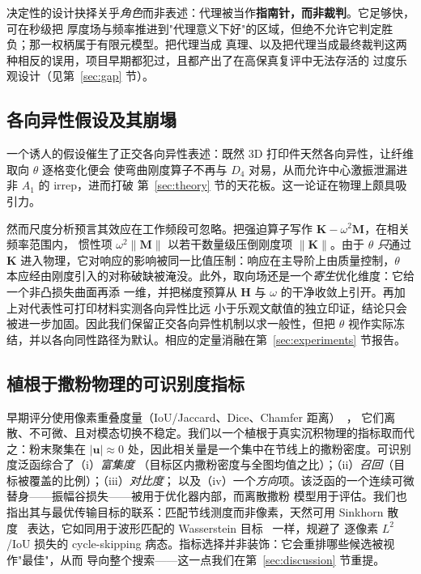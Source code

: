 \documentclass[11pt,a4paper]{article}
\newcommand{\Aone}{A_1}
\newcommand{\Dfour}{D_4}
\newcommand{\matH}{\mathbf{H}}
\newcommand{\matK}{\mathbf{K}}
\newcommand{\matM}{\mathbf{M}}
\begin{document}
决定性的设计抉择关乎\emph{角色}而非表述：代理被当作\textbf{指南针，而非裁判}。它足够快，可在秒级把
厚度场与频率推进到"代理意义下好"的区域，但绝不允许它判定胜负；那一权柄属于有限元模型。把代理当成
真理、以及把代理当成最终裁判这两种相反的误用，项目早期都犯过，且都产出了在高保真复评中无法存活的
过度乐观设计（见第~\ref{sec:gap} 节）。

\subsection{各向异性假设及其崩塌}\label{sec:aniso}
一个诱人的假设催生了正交各向异性表述：既然 3D 打印件天然各向异性，让纤维取向 $\theta$ 逐格变化便会
使弯曲刚度算子不再与 $\Dfour$ 对易，从而允许中心激振泄漏进非 $\Aone$ 的 irrep，进而打破
第~\ref{sec:theory} 节的天花板。这一论证在物理上颇具吸引力。

然而尺度分析预言其效应在工作频段可忽略。把强迫算子写作 $\matK-\omega^2\matM$，在相关频率范围内，
惯性项 $\omega^2\lVert\matM\rVert$ 以若干数量级压倒刚度项 $\lVert\matK\rVert$。由于 $\theta$
\emph{只}通过 $\matK$ 进入物理，它对响应的影响被同一比值压制：响应在主导阶上由质量控制，$\theta$
本应经由刚度引入的对称破缺被淹没。此外，取向场还是一个\emph{寄生}优化维度：它给一个非凸损失曲面再添
一维，并把梯度预算从 $\matH$ 与 $\omega$ 的干净收敛上引开。再加上对代表性可打印材料实测各向异性比远
小于乐观文献值的独立印证，结论只会被进一步加固。因此我们保留正交各向异性机制以求一般性，但把 $\theta$
视作实际冻结，并以各向同性路径为默认。相应的定量消融在第~\ref{sec:experiments} 节报告。

\subsection{植根于撒粉物理的可识别度指标}\label{sec:metric}
早期评分使用像素重叠度量（IoU/Jaccard、Dice、Chamfer 距离）~\cite{jaccard1912,dice1945,barrow1977}，
它们离散、不可微、且对模态切换不稳定。我们以一个植根于真实沉积物理的指标取而代之：粉末聚集在
$|\bm{u}|\approx0$ 处，因此相关量是一个集中在节线上的撒粉密度。可识别度泛函综合了（i）\emph{富集度}
（目标区内撒粉密度与全图均值之比）；（ii）\emph{召回}（目标被覆盖的比例）；（iii）\emph{对比度}；
以及（iv）一个\emph{方向}项。该泛函的一个连续可微替身------振幅谷损失------被用于优化器内部，而离散撒粉
模型用于评估。我们也指出其与最优传输目标的联系：匹配节线测度而非像素，天然可用 Sinkhorn
散度~\cite{cuturi2013} 表达，它如同用于波形匹配的 Wasserstein 目标~\cite{engquist2014} 一样，规避了
逐像素 $L^2$/IoU 损失的 cycle-skipping 病态。指标选择并非装饰：它会重排哪些候选被视作"最佳"，从而
导向整个搜索------这一点我们在第~\ref{sec:discussion} 节重提。
\end{document}
